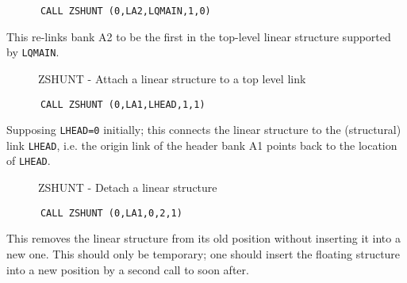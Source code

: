 \begin{verbatim}
      CALL ZSHUNT (0,LA2,LQMAIN,1,0)
\end{verbatim}
\par This re-links bank A2 to be the first in the top-level linear
structure supported by {\tt LQMAIN}.
\begin{figure}
\caption{ZSHUNT - Attach a linear structure to a top level link}
\label{FSHUNT6}
\end{figure}
\begin{verbatim}
      CALL ZSHUNT (0,LA1,LHEAD,1,1)
\end{verbatim}
\par Supposing {\tt LHEAD=0} initially; this connects the linear structure
to the (structural) link {\tt LHEAD}, i.e.
the origin link of the header bank A1
points back to the location of {\tt LHEAD}.
\begin{figure}
\caption{ZSHUNT - Detach a linear structure}
\label{FSHUNT7}
\end{figure}
\begin{verbatim}
      CALL ZSHUNT (0,LA1,0,2,1)
\end{verbatim}
\par This removes the linear structure from its old position
without inserting it into a new one.
This should only be temporary; one should insert the floating
structure into a new position by a second call to 
soon after.
